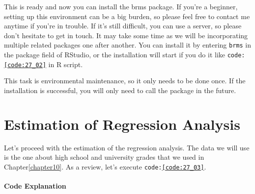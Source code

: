\documentclass{ltjsarticle}
\begin{document}
This is ready and now you can install the brms package. If you're a beginner, setting up this environment can be a big burden, so please feel free to contact me anytime if you're in trouble. If it's still difficult, you can use a server, so please don't hesitate to get in touch.
It may take some time as we will be incorporating multiple related packages one after another.
You can install it by entering \texttt{brms} in the package field of RStudio, or the installation will start if you do it like \texttt{code:\ref{code:27_02}} in R script.



This task is environmental maintenance, so it only needs to be done once. If the installation is successful, you will only need to call the package in the future.
\section{Estimation of Regression Analysis}
Let's proceed with the estimation of the regression analysis. The data we will use is the one about high school and university grades that we used in Chapter\ref{chapter10}. As a review, let's execute \texttt{code:\ref{code:27_03}}.


\paragraph{Code Explanation}

\end{document}
